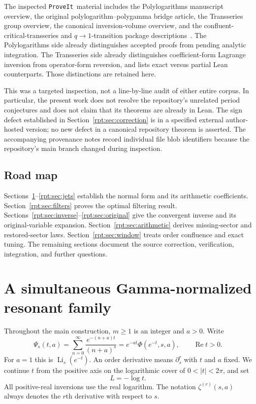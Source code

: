 \documentclass[11pt,a4paper]{article}
\numberwithin{equation}{section}
\theoremstyle{definition}\newtheorem{definition}[theorem]{Definition}
\theoremstyle{remark}\newtheorem{remark}[theorem]{Remark}
\newcommand{\Li}{\operatorname{Li}}
\newcommand{\repo}{\texttt{ProveIt}}
\DeclareMathOperator{\Repart}{Re}
\begin{document}
The inspected \repo\ material includes the Polylogarithms manuscript overview, the original polylogarithm--polygamma bridge article, the Transseries group overview, the canonical inversion-volume overview, and the confluent-critical-transseries and $q\to1$-transition package descriptions~\cite{repoPoly,repoBridge,repoTrans,repoConfluent,repoQ}. The Polylogarithms side already distinguishes accepted proofs from pending analytic integration. The Transseries side already distinguishes coefficient-form Lagrange inversion from operator-form reversion, and lists exact versus partial Lean counterparts. Those distinctions are retained here.

This was a targeted inspection, not a line-by-line audit of either entire corpus. In particular, the present work does not resolve the repository's unrelated period conjectures and does not claim that its theorems are already in Lean. The sign defect established in Section~\ref{rpt:sec:correction} is in a specified external author-hosted version; no new defect in a canonical repository theorem is asserted. The accompanying provenance notes record individual file blob identifiers because the repository's main branch changed during inspection.

\subsection{Road map}

Sections~\ref{rpt:sec:family}--\ref{rpt:sec:jets} establish the normal form and its arithmetic coefficients. Section~\ref{rpt:sec:filters} proves the optimal filtering result. Sections~\ref{rpt:sec:inverse}--\ref{rpt:sec:original} give the convergent inverse and its original-variable expansion. Section~\ref{rpt:sec:arithmetic} derives missing-sector and restored-sector laws. Section~\ref{rpt:sec:window} treats order confluence and exact tuning. The remaining sections document the source correction, verification, integration, and further questions.

\section{A simultaneous Gamma-normalized resonant family}
\label{rpt:sec:family}

Throughout the main construction, $m\ge1$ is an integer and $a>0$. Write
\begin{equation}
\Psi_s(t,a)=\sum_{n=0}^{\infty}\frac{e^{-(n+a)t}}{(n+a)^s}
=e^{-at}\Phi(e^{-t},s,a),\qquad \Repart t>0.
\label{rpt:eq:Psi}
\end{equation}
For $a=1$ this is $\Li_s(e^{-t})$. An order derivative means $\partial_s^r$ with $t$ and $a$ fixed. We continue $t$ from the positive axis on the logarithmic cover of $0<|t|<2\pi$, and set
\[
L=-\log t.
\]
All positive-real inversions use the real logarithm. The notation $\zeta^{(r)}(s,a)$ always denotes the $r$th derivative with respect to $s$.
\end{document}
